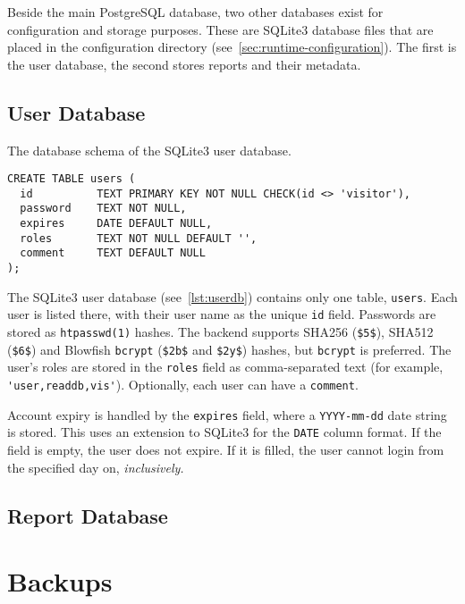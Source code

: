 Beside the main PostgreSQL database, two other databases exist for configuration and storage purposes.
These are SQLite3 database files that are placed in the configuration directory (see~\cref{sec:runtime-configuration}).
The first is the user database, the second stores reports and their metadata.


\subsection{User Database}
\label{sec:user-database}

\begin{lstfloat}
  \centering
  \caption{The database schema of the SQLite3 user database.}
  \label{lst:userdb}

  \begin{lstlisting}
CREATE TABLE users (
  id          TEXT PRIMARY KEY NOT NULL CHECK(id <> 'visitor'),
  password    TEXT NOT NULL,
  expires     DATE DEFAULT NULL,
  roles       TEXT NOT NULL DEFAULT '',
  comment     TEXT DEFAULT NULL
);
  \end{lstlisting}
\end{lstfloat}

The SQLite3 user database (see~\cref{lst:userdb}) contains only one table, \verb!users!.
Each user is listed there, with their user name as the unique \verb!id! field.
Passwords are stored as \verb!htpasswd(1)! hashes.
The backend supports SHA256 (\verb!$5$!), SHA512 (\verb!$6$!) and Blowfish \verb!bcrypt! (\verb!$2b$! and \verb!$2y$!) hashes, but \verb!bcrypt! is preferred.
The user's roles are stored in the \verb!roles! field as comma-separated text (for example, \verb!'user,readdb,vis'!).
Optionally, each user can have a \verb!comment!.

Account expiry is handled by the \verb!expires! field, where a \verb!YYYY-mm-dd! date string is stored.
This uses an extension to SQLite3 for the \verb!DATE! column format.
If the field is empty, the user does not expire.
If it is filled, the user cannot login from the specified day on, \emph{inclusively.}


\subsection{Report Database}

\section{Backups}
